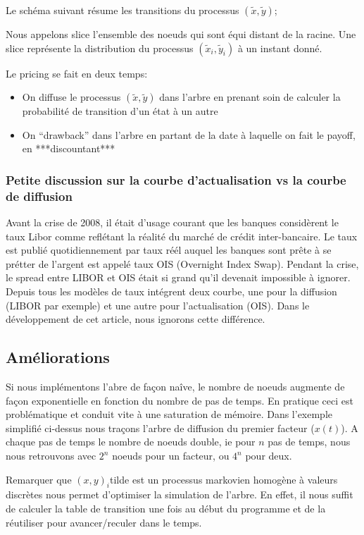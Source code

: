 Le schéma suivant résume les transitions du processus {$(\widetilde{x}, \widetilde{y})$};



Nous appelons slice l'ensemble des noeuds qui sont équi distant de la racine. Une slice représente la distribution du processus $( \widetilde{x}_i, \widetilde{y}_i)$ à un instant donné.

Le pricing se fait en deux temps:
\begin{itemize}
\item On diffuse le processus $(\widetilde{x}, \widetilde{y})$ dans l'arbre en prenant soin de calculer la probabilité de transition d'un état à un autre
\item On ``drawback'' dans l'arbre en partant de la date à laquelle on fait le payoff, en ***discountant***
\end{itemize}

  \subsubsection*{Petite discussion sur la courbe d'actualisation vs la courbe de diffusion}
  Avant la crise de 2008, il était d'usage courant que les banques considèrent le taux Libor comme reflétant la réalité du marché de crédit inter-bancaire. Le taux est publié quotidiennement par
taux réél auquel les banques sont prête à se prétter de l'argent est appelé taux OIS (Overnight Index Swap).  
Pendant la crise, le spread entre LIBOR et OIS était si grand qu'il devenait impossible à ignorer. Depuis tous les modèles de taux intégrent deux courbe, une pour la diffusion (LIBOR par exemple) et une autre pour l'actualisation (OIS).
Dans le développement de cet article, nous ignorons cette différence.
  
\subsection{Améliorations}
Si nous implémentons l'abre de façon naîve, le nombre de noeuds augmente de façon exponentielle en fonction du nombre de pas de temps. En pratique ceci est problématique et conduit vite à une saturation de mémoire. Dans l'exemple simplifié ci-dessus nous traçons l'arbre de diffusion du premier facteur ($x(t)$). A chaque pas de temps le nombre de noeuds double, ie pour $n$ pas de temps, nous nous retrouvons avec $2^n$ noeuds pour un facteur, ou $4^n$ pour deux. 



Remarquer que $(x, y)_i$tilde est un processus markovien homogène à valeurs discrètes nous permet d'optimiser la simulation de l'arbre. En effet, il nous suffit de calculer la table de transition une fois au début du programme et de la réutiliser pour avancer/reculer dans le temps. 

